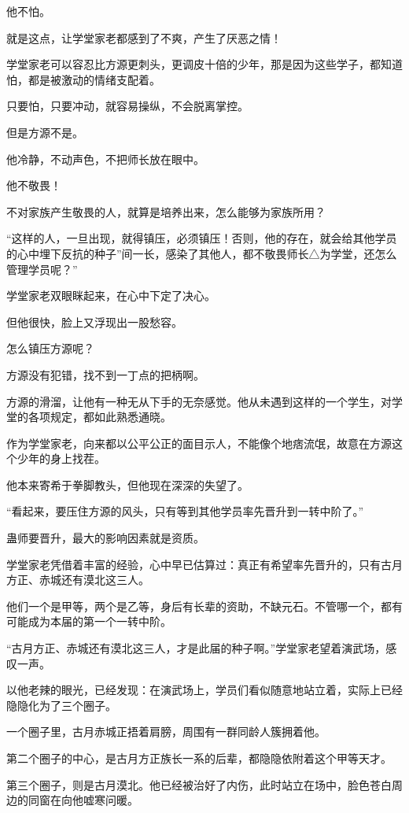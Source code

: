 \begin{this_body}
他不怕。

就是这点，让学堂家老都感到了不爽，产生了厌恶之情！

学堂家老可以容忍比方源更刺头，更调皮十倍的少年，那是因为这些学子，都知道怕，都是被激动的情绪支配着。

只要怕，只要冲动，就容易操纵，不会脱离掌控。

但是方源不是。

他冷静，不动声色，不把师长放在眼中。

他不敬畏！

不对家族产生敬畏的人，就算是培养出来，怎么能够为家族所用？

“这样的人，一旦出现，就得镇压，必须镇压！否则，他的存在，就会给其他学员的心中埋下反抗的种子”间一长，感染了其他人，都不敬畏师长△为学堂，还怎么管理学员呢？”

学堂家老双眼眯起来，在心中下定了决心。

但他很快，脸上又浮现出一股愁容。

怎么镇压方源呢？

方源没有犯错，找不到一丁点的把柄啊。

方源的滑溜，让他有一种无从下手的无奈感觉。他从未遇到这样的一个学生，对学堂的各项规定，都如此熟悉通晓。

作为学堂家老，向来都以公平公正的面目示人，不能像个地痞流氓，故意在方源这个少年的身上找茬。

他本来寄希于拳脚教头，但他现在深深的失望了。

“看起来，要压住方源的风头，只有等到其他学员率先晋升到一转中阶了。”

蛊师要晋升，最大的影响因素就是资质。

学堂家老凭借着丰富的经验，心中早已估算过：真正有希望率先晋升的，只有古月方正、赤城还有漠北这三人。

他们一个是甲等，两个是乙等，身后有长辈的资助，不缺元石。不管哪一个，都有可能成为本届的第一个一转中阶。

“古月方正、赤城还有漠北这三人，才是此届的种子啊。”学堂家老望着演武场，感叹一声。

以他老辣的眼光，已经发现：在演武场上，学员们看似随意地站立着，实际上已经隐隐化为了三个圈子。

一个圈子里，古月赤城正捂着肩膀，周围有一群同龄人簇拥着他。

第二个圈子的中心，是古月方正族长一系的后辈，都隐隐依附着这个甲等天才。

第三个圈子，则是古月漠北。他已经被治好了内伤，此时站立在场中，脸色苍白周边的同窗在向他嘘寒问暖。


\end{this_body}
